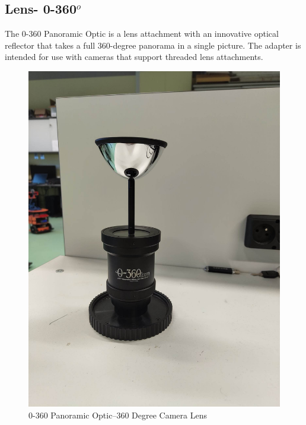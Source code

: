 \documentclass[11pt, a4paper, openany]{book}
\begin{document}
\subsection{Lens- 0-360$^{o}$}
The 0-360 Panoramic Optic is a lens attachment with an innovative optical reflector that takes a full 360-degree panorama in a single picture. The adapter is intended for use with cameras that support threaded lens attachments. 
\begin{figure}[H]
    \centering
    \includegraphics[scale=0.09]{Labbot&ele/4.jpg}
    \caption{0-360 Panoramic Optic–360 Degree Camera Lens}
    \label{fig:Camera}
\end{figure}\

\end{document}
